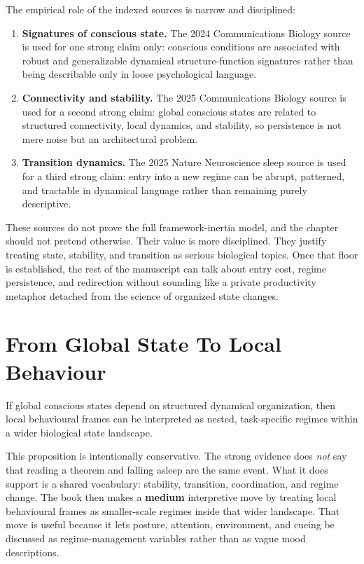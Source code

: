 The empirical role of the indexed sources is narrow and disciplined:
\begin{enumerate}[nosep]
  \item \textbf{Signatures of conscious state.} The 2024 Communications
        Biology source is used for one strong claim only: conscious conditions
        are associated with robust and generalizable dynamical
        structure-function signatures rather than being describable only in
        loose psychological language.
  \item \textbf{Connectivity and stability.} The 2025 Communications Biology
        source is used for a second strong claim: global conscious states are
        related to structured connectivity, local dynamics, and stability, so
        persistence is not mere noise but an architectural problem.
  \item \textbf{Transition dynamics.} The 2025 Nature Neuroscience sleep
        source is used for a third strong claim: entry into a new regime can
        be abrupt, patterned, and tractable in dynamical language rather than
        remaining purely descriptive.
\end{enumerate}

\begin{discussion}
These sources do not prove the full framework-inertia model, and the chapter
should not pretend otherwise. Their value is more disciplined. They justify
treating state, stability, and transition as serious biological topics. Once
that floor is established, the rest of the manuscript can talk about entry
cost, regime persistence, and redirection without sounding like a private
productivity metaphor detached from the science of organized state changes.
\end{discussion}

\section{From Global State To Local Behaviour}

\begin{proposition}
If global conscious states depend on structured dynamical organization, then
local behavioural frames can be interpreted as nested, task-specific regimes
within a wider biological state landscape.
\end{proposition}

\begin{discussion}
This proposition is intentionally conservative. The strong evidence does
\emph{not} say that reading a theorem and falling asleep are the same event.
What it does support is a shared vocabulary: stability, transition,
coordination, and regime change. The book then makes a \textbf{medium}
interpretive move by treating local behavioural frames as smaller-scale regimes
inside that wider landscape. That move is useful because it lets posture,
attention, environment, and cueing be discussed as regime-management variables
rather than as vague mood descriptions.
\end{discussion}

